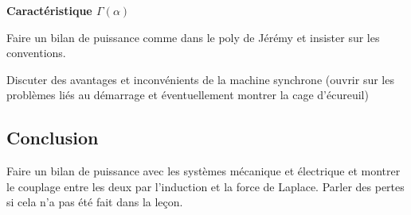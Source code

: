 \begin{slide}
\textbf{Caractéristique $\Gamma(\alpha)$}
\end{slide}

Faire un bilan de puissance comme dans le poly de Jérémy et insister sur les conventions.

Discuter des avantages et inconvénients de la machine synchrone (ouvrir sur les problèmes liés au démarrage et éventuellement montrer la cage d'écureuil)

\subsection*{Conclusion}

Faire un bilan de puissance avec les systèmes mécanique et électrique et montrer le couplage entre les deux par l'induction et la force de Laplace.
Parler des pertes si cela n'a pas été fait dans la leçon.

\newpage